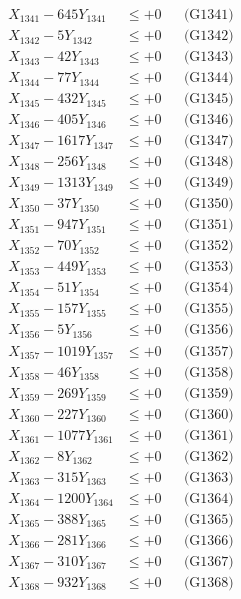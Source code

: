 \documentclass[a4paper,10pt]{article}
\begin{document}
{\begin{align}
\allowbreak
X_{1341} - 645Y_{1341} &\leq +0 && \text{(G1341)} \\
X_{1342} - 5Y_{1342} &\leq +0 && \text{(G1342)} \\
X_{1343} - 42Y_{1343} &\leq +0 && \text{(G1343)} \\
X_{1344} - 77Y_{1344} &\leq +0 && \text{(G1344)} \\
X_{1345} - 432Y_{1345} &\leq +0 && \text{(G1345)} \\
X_{1346} - 405Y_{1346} &\leq +0 && \text{(G1346)} \\
X_{1347} - 1617Y_{1347} &\leq +0 && \text{(G1347)} \\
X_{1348} - 256Y_{1348} &\leq +0 && \text{(G1348)} \\
X_{1349} - 1313Y_{1349} &\leq +0 && \text{(G1349)} \\
X_{1350} - 37Y_{1350} &\leq +0 && \text{(G1350)} \\
\allowbreak
X_{1351} - 947Y_{1351} &\leq +0 && \text{(G1351)} \\
X_{1352} - 70Y_{1352} &\leq +0 && \text{(G1352)} \\
X_{1353} - 449Y_{1353} &\leq +0 && \text{(G1353)} \\
X_{1354} - 51Y_{1354} &\leq +0 && \text{(G1354)} \\
X_{1355} - 157Y_{1355} &\leq +0 && \text{(G1355)} \\
X_{1356} - 5Y_{1356} &\leq +0 && \text{(G1356)} \\
X_{1357} - 1019Y_{1357} &\leq +0 && \text{(G1357)} \\
X_{1358} - 46Y_{1358} &\leq +0 && \text{(G1358)} \\
X_{1359} - 269Y_{1359} &\leq +0 && \text{(G1359)} \\
X_{1360} - 227Y_{1360} &\leq +0 && \text{(G1360)} \\
\allowbreak
X_{1361} - 1077Y_{1361} &\leq +0 && \text{(G1361)} \\
X_{1362} - 8Y_{1362} &\leq +0 && \text{(G1362)} \\
X_{1363} - 315Y_{1363} &\leq +0 && \text{(G1363)} \\
X_{1364} - 1200Y_{1364} &\leq +0 && \text{(G1364)} \\
X_{1365} - 388Y_{1365} &\leq +0 && \text{(G1365)} \\
X_{1366} - 281Y_{1366} &\leq +0 && \text{(G1366)} \\
X_{1367} - 310Y_{1367} &\leq +0 && \text{(G1367)} \\
X_{1368} - 932Y_{1368} &\leq +0 && \text{(G1368)} \\

\end{align}}
\end{document}
